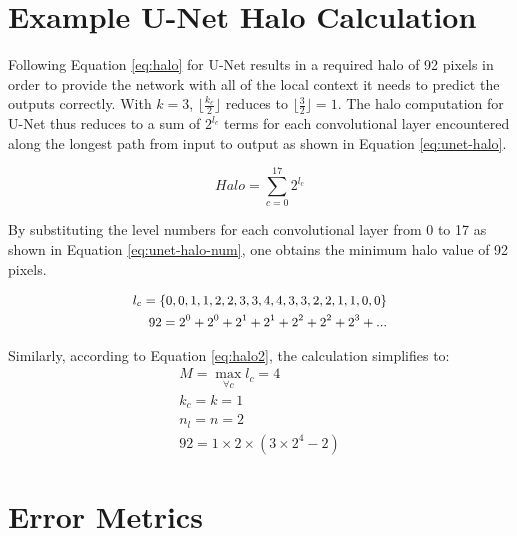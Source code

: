 \documentclass[twoside,11pt]{article}
\begin{document}
\section{Example U-Net Halo Calculation}

Following Equation \ref{eq:halo} for U-Net results in a required halo of 92 pixels in order to provide the network with all of the local context it needs to predict the outputs correctly. With $k = 3$, $\lfloor \frac{k_c}{2} \rfloor$ reduces to $\lfloor \frac{3}{2} \rfloor = 1$. The halo computation for U-Net thus reduces to a sum of $2^{l_c}$ terms for each convolutional layer encountered along the longest path from input to output as shown in Equation \ref{eq:unet-halo}. 

\begin{equation}
Halo = \sum_{c=0}^{17} 2^{l_c}
\label{eq:unet-halo}
\end{equation}

By substituting the level numbers for each convolutional layer from 0 to 17 as shown in Equation \ref{eq:unet-halo-num}, one obtains the minimum halo value of 92 pixels. 

\begin{equation}
\begin{small}
\begin{aligned} 
l_c = \{0, 0, 1, 1, 2, 2, 3, 3, 4, 4, 3, 3, 2, 2, 1, 1, 0, 0\} \\
92 = 2^0 + 2^0 + 2^1 + 2^1 + 2^2 + 2^2 + 2^3 + ...
\end{aligned}
\end{small}
\label{eq:unet-halo-num}
\end{equation}

Similarly, according to Equation \ref{eq:halo2}, the calculation simplifies to:
\begin{equation}
\begin{aligned} 
M=\max_{\forall c} { l_c } = 4\\
k_c = k = 1  \\
n_l = n = 2 \\
92 = 1 \times 2 \times (3 \times 2^4 - 2)
\end{aligned}
\label{eq:unet-halo-num2}
\end{equation}


\section{Error Metrics}
\end{document}
